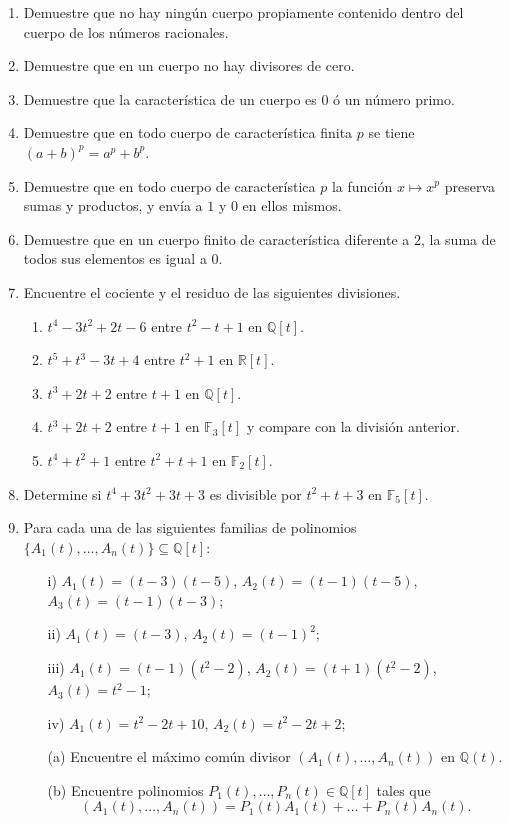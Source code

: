 \begin{enumerate}
\item Demuestre que no hay ningún cuerpo propiamente contenido dentro del cuerpo de los números racionales.

\item Demuestre que en un cuerpo no hay divisores de cero.

\item Demuestre que la característica de un cuerpo es $0$ ó un número primo.

\item Demuestre que en todo cuerpo de característica finita $p$ se tiene $(a+b)^p=a^p+b^p$.

\item Demuestre que en todo cuerpo de característica $p$ la función $x\mapsto x^p$ preserva sumas y productos, y envía a $1$ y $0$ en ellos mismos.

\item Demuestre que en un cuerpo finito de característica diferente a $2$, la suma de todos sus elementos es igual a $0$.

\item Encuentre el cociente y el residuo de las siguientes divisiones.
  \begin{enumerate}
    \item $t^4-3t^2+2t-6$ entre $t^2-t+1$ en $\mathbb{Q}[t]$.
    \item $t^5+t^3-3t+4$ entre $t^2+1$ en $\mathbb{R}[t]$.
    \item $t^3+2t+2$ entre $t+1$ en $\mathbb{Q}[t]$.
    \item $t^3+2t+2$ entre $t+1$ en $\mathbb{F}_3[t]$ y compare con la división anterior.
    \item $t^4+t^2+1$ entre $t^2+t+1$ en $\mathbb{F}_2[t]$.
  \end{enumerate}
\item Determine si $t^4+3t^2+3t+3$ es divisible por $t^2+t+3$ en $\mathbb{F}_5[t]$.

\item Para cada una de las siguientes familias de polinomios $\{A_1(t),\ldots,A_n(t)\}\subseteq\mathbb{Q}[t]$:
\begin{itemize}
\item[i)] $A_1(t)=(t-3)(t-5)$, $A_2(t)=(t-1)(t-5)$, $A_3(t)=(t-1)(t-3)$;
\item[ii)] $A_1(t)=(t-3)$, $A_2(t)=(t-1)^2$;
\item[iii)] $A_1(t)=(t-1)(t^2-2)$, $A_2(t)=(t+1)(t^2-2)$, $A_3(t)=t^2-1$;
\item[iv)] $A_1(t)=t^2-2t+10$, $A_2(t)=t^2-2t+2$;
\end{itemize}
\begin{itemize}
\item[(a)] Encuentre el máximo común divisor $\left(A_1(t),\ldots,A_n(t)\right)$ en $\mathbb{Q}(t)$.
\item[(b)] Encuentre polinomios $P_1(t),\ldots,P_n(t)\in\mathbb{Q}[t]$ tales que
$$\left(A_1(t),\ldots,A_n(t)\right)=P_1(t)A_1(t)+\ldots+P_n(t)A_n(t).$$
\end{itemize}


\end{enumerate}

